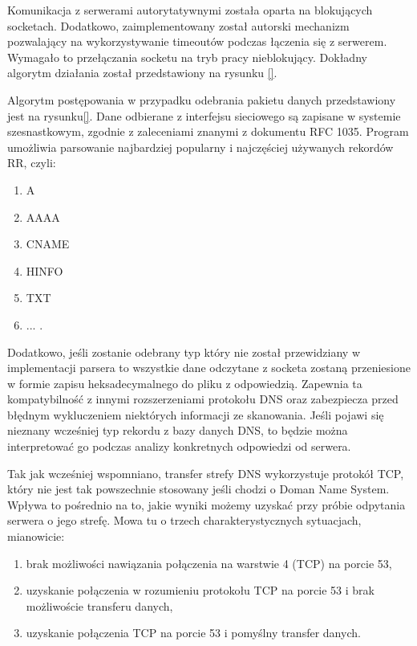Komunikacja z serwerami autorytatywnymi została oparta na blokujących socketach. Dodatkowo, zaimplementowany został autorski mechanizm pozwalający na wykorzystywanie timeoutów podczas łączenia się z serwerem. Wymagało to przełączania socketu na tryb pracy nieblokujący. Dokładny algorytm działania został przedstawiony na rysunku \ref{}.

Algorytm postępowania w przypadku odebrania pakietu danych przedstawiony jest na rysunku\ref{}. Dane odbierane z interfejsu sieciowego są zapisane w systemie szesnastkowym, zgodnie z zaleceniami znanymi z dokumentu RFC 1035\cite{RFC1035}. Program umożliwia parsowanie najbardziej popularny i najczęściej używanych rekordów RR, czyli:
\begin{enumerate}
	\item A
	\item AAAA
	\item CNAME
	\item HINFO
	\item TXT
	\item ... .
\end{enumerate} 

Dodatkowo, jeśli zostanie odebrany typ który nie został przewidziany w implementacji parsera to wszystkie dane odczytane z socketa zostaną przeniesione w formie zapisu heksadecymalnego do pliku z odpowiedzią. Zapewnia ta kompatybilność z innymi rozszerzeniami protokołu DNS oraz zabezpiecza przed błędnym wykluczeniem niektórych informacji ze skanowania. Jeśli pojawi się nieznany wcześniej typ rekordu z bazy danych DNS, to będzie można interpretować go podczas analizy konkretnych odpowiedzi od serwera.

Tak jak wcześniej wspomniano, transfer strefy DNS wykorzystuje protokół TCP, który nie jest tak powszechnie stosowany jeśli chodzi o Doman Name System. Wpływa to pośrednio na to, jakie wyniki możemy uzyskać przy próbie odpytania serwera o jego strefę. Mowa tu o trzech charakterystycznych sytuacjach, mianowicie:
\begin{enumerate}
	\item brak możliwości nawiązania połączenia na warstwie 4 (TCP) na porcie 53,
	\item uzyskanie połączenia w rozumieniu protokołu TCP na porcie 53 i brak możliwoście transferu danych,
	\item uzyskanie połączenia TCP na porcie 53 i pomyślny transfer danych.
\end{enumerate}

